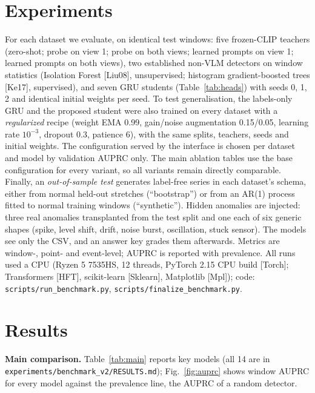 \documentclass[twoside,english]{article}
\renewcommand{\cite}[1]{[#1]}
\begin{document}
\section{Experiments} \label{sec:exp}
For each dataset we evaluate, on identical test windows: five frozen-CLIP teachers (zero-shot; probe on view 1; probe on both views; learned prompts on view 1; learned prompts on both views), two established non-VLM detectors on window statistics (Isolation Forest \cite{Liu08}, unsupervised; histogram gradient-boosted trees \cite{Ke17}, supervised), and seven GRU students (Table~\ref{tab:heads}) with seeds 0, 1, 2 and identical initial weights per seed. To test generalisation, the labels-only GRU and the proposed student were also trained on every dataset with a \emph{regularized} recipe (weight EMA 0.99, gain/noise augmentation 0.15/0.05, learning rate $10^{-3}$, dropout 0.3, patience 6), with the same splits, teachers, seeds and initial weights. The configuration served by the interface is chosen per dataset and model by validation AUPRC only. The main ablation tables use the base configuration for every variant, so all variants remain directly comparable. Finally, an \emph{out-of-sample test} generates label-free series in each dataset's schema, either from normal held-out stretches (``bootstrap'') or from an AR(1) process fitted to normal training windows (``synthetic''). Hidden anomalies are injected: three real anomalies transplanted from the test split and one each of six generic shapes (spike, level shift, drift, noise burst, oscillation, stuck sensor). The models see only the CSV, and an answer key grades them afterwards. Metrics are window-, point- and event-level; AUPRC is reported with prevalence. All runs used a CPU (Ryzen 5 7535HS, 12 threads, PyTorch 2.15 CPU build \cite{Torch}; Transformers \cite{HFT}, scikit-learn \cite{Sklearn}, Matplotlib \cite{Mpl}); code: \texttt{scripts/run\_benchmark.py}, \texttt{scripts/finalize\_benchmark.py}.

\section{Results} \label{sec:results}
\textbf{Main comparison.} Table~\ref{tab:main} reports key models (all 14 are in \texttt{experiments/benchmark\_v2/RESULTS.md}); Fig.~\ref{fig:auprc} shows window AUPRC for every model against the prevalence line, the AUPRC of a random detector.

\begin{table}[h]
\centering\scriptsize
\caption{Held-out test results, base training configuration (students: mean $\pm$ std over seeds 0--2; regularized results in Table~\ref{tab:gen}). Prevalence: windows/timesteps.}
\label{tab:main}
\resizebox{\linewidth}{!}{}
\end{table}
\end{document}
